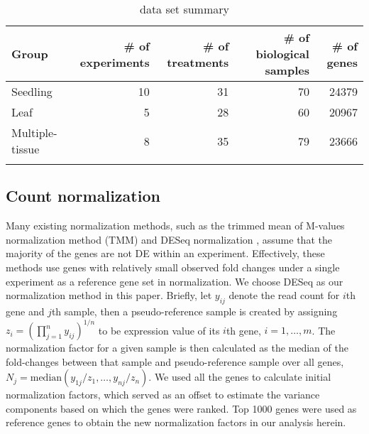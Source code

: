 \documentclass[11pt, a4paper]{article}
\begin{document}
   \begin{table}[h]
   	\centering
   	\caption[3.2]{data set summary}
   	\begin{tabular}{lrrrr} \hline
   		Group & \# of experiments & \# of treatments  & \# of biological samples & \# of genes \\ \hline
   		Seedling &10 & 31 &70  &24379  \\
   		Leaf &5 & 28 & 60 &20967  \\
   		Multiple-tissue &8 &35  &79  & 23666\\ \hline
   		 \label{TableSet3}
   	\end{tabular}
   \end{table}
   


\subsection{Count normalization}\label{countNormalization}

Many existing normalization methods, such as the trimmed mean of M-values normalization method (TMM) \citep{robinson2010scaling} and DESeq normalization \citep{anders2010differential}, assume that the majority of the genes are not DE within an experiment. Effectively, these methods use genes with relatively small observed fold changes under a single experiment as a reference gene set in normalization. We choose DESeq \citep{anders2010differential} as our normalization method in this paper. Briefly, let $y_{ij}$ denote the read count for $i$th gene and $j$th sample, then a pseudo-reference sample is created by assigning $z_i = (\prod_{j=1}^ny_{ij})^{1/n}$ to be expression value of its $i$th gene, $i=1, \ldots, m$. The normalization factor for a given sample is then calculated as the median of the fold-changes between that sample and pseudo-reference sample over all genes, $N_j = \text{median}(y_{1j}/z_1, \ldots, y_{nj}/z_n)$. We used all the genes to calculate initial normalization factors, which served as an offset to estimate the variance components based on which the genes were ranked. Top 1000 genes were used as reference genes to obtain the new normalization factors in our analysis herein. 
\end{document}
